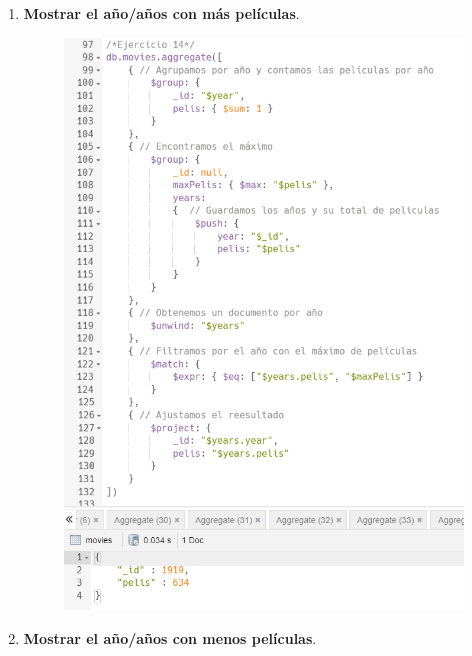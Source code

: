 \documentclass[a4paper,onecolumn]{article}
\begin{document}
\begin{sloppypar}
\begin{enumerate}
\begin{center}
\begin{figure}[h!]
        \end{figure}
    \end{center}
    \item \textbf{Mostrar el año/años con más películas}.
    \begin{center}
        \begin{figure}[h!]
            \includegraphics[width=\textwidth]{querys/14.png}
        \end{figure}
    \end{center}
    \item \textbf{Mostrar el año/años con menos películas}.
    \begin{center}
        \begin{figure}[h!]

\end{figure}
\end{center}
\end{enumerate}
\end{sloppypar}
\end{document}
